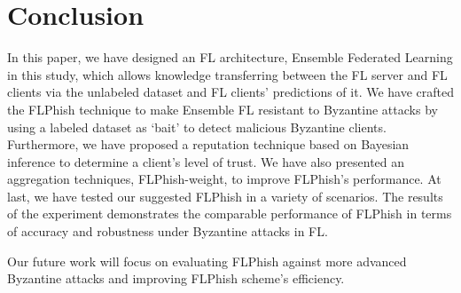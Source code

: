 \documentclass[journal]{IEEEtran}
\begin{document}
\section{Conclusion}

In this paper, we have designed an FL architecture, Ensemble Federated Learning in this study, which allows knowledge transferring between the FL server and FL clients via the unlabeled dataset and FL clients' predictions of it. We have crafted the FLPhish technique to make Ensemble FL resistant to Byzantine attacks by using a labeled dataset as `bait' to detect malicious Byzantine clients. Furthermore, we have proposed a reputation technique based on Bayesian inference to determine a client's level of trust. We have also presented an aggregation techniques, FLPhish-weight, to improve FLPhish's performance. At last, we have tested our suggested FLPhish in a variety of scenarios. The results of the experiment demonstrates the comparable performance of FLPhish in terms of accuracy and robustness under Byzantine attacks in FL. 
\par Our future work will focus on evaluating FLPhish against more advanced Byzantine attacks and improving FLPhish scheme's efficiency.









\end{document}
